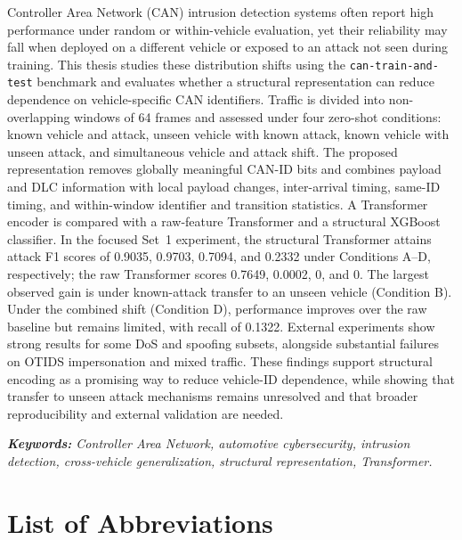 \documentclass[12pt, a4paper, reqno, oneside]{book}
\begin{document}
Controller Area Network (CAN) intrusion detection systems often report high performance under random or within-vehicle evaluation, yet their reliability may fall when deployed on a different vehicle or exposed to an attack not seen during training. This thesis studies these distribution shifts using the \texttt{can-train-and-test} benchmark and evaluates whether a structural representation can reduce dependence on vehicle-specific CAN identifiers. Traffic is divided into non-overlapping windows of 64 frames and assessed under four zero-shot conditions: known vehicle and attack, unseen vehicle with known attack, known vehicle with unseen attack, and simultaneous vehicle and attack shift. The proposed representation removes globally meaningful CAN-ID bits and combines payload and DLC information with local payload changes, inter-arrival timing, same-ID timing, and within-window identifier and transition statistics. A Transformer encoder is compared with a raw-feature Transformer and a structural XGBoost classifier. In the focused Set~1 experiment, the structural Transformer attains attack F1 scores of 0.9035, 0.9703, 0.7094, and 0.2332 under Conditions A--D, respectively; the raw Transformer scores 0.7649, 0.0002, 0, and 0. The largest observed gain is under known-attack transfer to an unseen vehicle (Condition B). Under the combined shift (Condition D), performance improves over the raw baseline but remains limited, with recall of 0.1322. External experiments show strong results for some DoS and spoofing subsets, alongside substantial failures on OTIDS impersonation and mixed traffic. These findings support structural encoding as a promising way to reduce vehicle-ID dependence, while showing that transfer to unseen attack mechanisms remains unresolved and that broader reproducibility and external validation are needed.

\vspace{1em}
\noindent \textit{\textbf{Keywords:} Controller Area Network, automotive cybersecurity, intrusion detection, cross-vehicle generalization, structural representation, Transformer.}


\newpage
\tableofcontents

\newpage
\listoffigures
 

\newpage
\listoftables

\newpage
\chapter*{List of Abbreviations}
\vspace{20pt}
\end{document}
